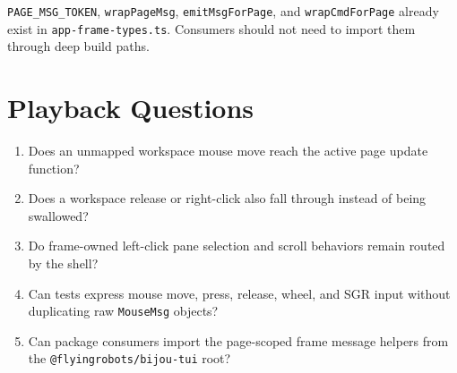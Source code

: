 \texttt{P\allowbreak{}A\allowbreak{}G\allowbreak{}E\allowbreak{}\_\allowbreak{}M\allowbreak{}S\allowbreak{}G\allowbreak{}\_\allowbreak{}T\allowbreak{}O\allowbreak{}K\allowbreak{}E\allowbreak{}N}, \texttt{w\allowbreak{}r\allowbreak{}a\allowbreak{}p\allowbreak{}P\allowbreak{}a\allowbreak{}g\allowbreak{}e\allowbreak{}M\allowbreak{}s\allowbreak{}g}, \texttt{e\allowbreak{}m\allowbreak{}i\allowbreak{}t\allowbreak{}M\allowbreak{}s\allowbreak{}g\allowbreak{}F\allowbreak{}o\allowbreak{}r\allowbreak{}P\allowbreak{}a\allowbreak{}g\allowbreak{}e}, and \texttt{w\allowbreak{}r\allowbreak{}a\allowbreak{}p\allowbreak{}C\allowbreak{}m\allowbreak{}d\allowbreak{}F\allowbreak{}o\allowbreak{}r\allowbreak{}P\allowbreak{}a\allowbreak{}g\allowbreak{}e} already exist in \texttt{a\allowbreak{}p\allowbreak{}p\allowbreak{}-\allowbreak{}f\allowbreak{}r\allowbreak{}a\allowbreak{}m\allowbreak{}e\allowbreak{}-\allowbreak{}t\allowbreak{}y\allowbreak{}p\allowbreak{}e\allowbreak{}s\allowbreak{}.\allowbreak{}t\allowbreak{}s}. Consumers should not need to import them through deep build paths.

\section{Playback Questions}\label{record-165-playback-questions}

\begin{enumerate}
\def\labelenumi{\arabic{enumi}.}
\tightlist
\item
  Does an unmapped workspace mouse move reach the active page update function?
\item
  Does a workspace release or right-click also fall through instead of being swallowed?
\item
  Do frame-owned left-click pane selection and scroll behaviors remain routed by the shell?
\item
  Can tests express mouse move, press, release, wheel, and SGR input without duplicating raw \texttt{M\allowbreak{}o\allowbreak{}u\allowbreak{}s\allowbreak{}e\allowbreak{}M\allowbreak{}s\allowbreak{}g} objects?
\item
  Can package consumers import the page-scoped frame message helpers from the \texttt{@\allowbreak{}f\allowbreak{}l\allowbreak{}y\allowbreak{}i\allowbreak{}n\allowbreak{}g\allowbreak{}r\allowbreak{}o\allowbreak{}b\allowbreak{}o\allowbreak{}t\allowbreak{}s\allowbreak{}/\allowbreak{}b\allowbreak{}i\allowbreak{}j\allowbreak{}o\allowbreak{}u\allowbreak{}-\allowbreak{}t\allowbreak{}u\allowbreak{}i} root?
\end{enumerate}


